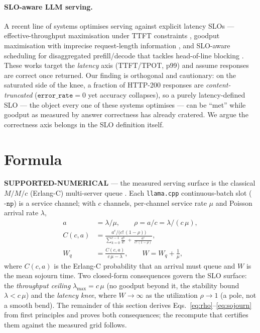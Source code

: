 \documentclass[11pt,a4paper]{article}
\begin{document}
\paragraph{SLO-aware LLM serving.} A recent line of systems optimises serving
against explicit latency SLOs --- effective-throughput maximisation under TTFT
constraints \citep{gao2025aptserve}, goodput maximisation with imprecise
request-length information \citep{zhang2025jitserve}, and SLO-aware scheduling
for disaggregated prefill/decode that tackles head-of-line blocking
\citep{wang2026kairos}. These works target the \emph{latency} axis (TTFT/TPOT,
p99) and assume responses are correct once returned. Our finding is orthogonal
and cautionary: on the saturated side of the knee, a fraction of HTTP-200
responses are \emph{content-truncated} (\(\texttt{error\_rate}=0\) yet accuracy
collapses), so a purely latency-defined SLO --- the object every one of these
systems optimises --- can be ``met'' while goodput as measured by answer
correctness has already cratered. We argue the correctness axis belongs in the
SLO definition itself.

\section{Formula}
\label{sec:formula}
\textcolor{green!50!black}{\textbf{SUPPORTED-NUMERICAL}} --- the measured serving
surface is the classical \(M/M/c\) (Erlang-C) multi-server queue
\citep{erlang1917,kleinrock1975,harchol2013}. Each \texttt{llama.cpp}
continuous-batch slot (\(\texttt{-np}\)) is a service channel; with \(c\)
channels, per-channel service rate \(\mu\) and Poisson arrival rate \(\lambda\),
\begin{align}
  a &= \lambda/\mu, \qquad \rho = a/c = \lambda/(c\,\mu), \label{eq:rho}\\
  C(c,a) &= \frac{a^{c}/\!\big(c!\,(1-\rho)\big)}
               {\displaystyle\sum_{k=0}^{c-1}\frac{a^{k}}{k!}
                \;+\; \frac{a^{c}}{c!\,(1-\rho)}}, \label{eq:erlangc}\\
  W_q &= \frac{C(c,a)}{c\,\mu - \lambda}, \qquad
  W = W_q + \frac{1}{\mu}, \label{eq:sojourn}
\end{align}
where \(C(c,a)\) is the Erlang-C probability that an arrival must queue and \(W\)
is the mean sojourn time. Two closed-form consequences govern the SLO surface:
the \emph{throughput ceiling} \(\lambda_{\max} = c\,\mu\) (no goodput beyond it,
the stability bound \(\lambda < c\,\mu\)) and the \emph{latency knee}, where
\(W\to\infty\) as the utilization \(\rho\to 1\) (a pole, not a smooth bend). The
remainder of this section derives Eqs.~\eqref{eq:rho}--\eqref{eq:sojourn} from
first principles and proves both consequences; the recompute that certifies them
against the measured grid follows.
\end{document}
